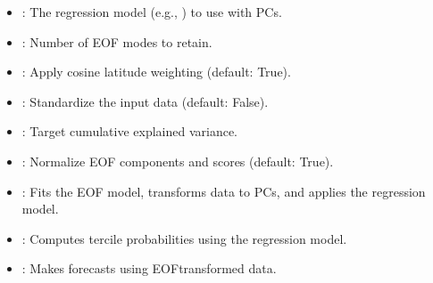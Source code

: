 \documentclass[letterpaper,10pt,english]{sphinxmanual}
\begin{document}
\sphinxAtStartPar
{}
\begin{itemize}
\item {} 
\sphinxAtStartPar
{}: The regression model (e.g., ) to use with PCs.

\item {} 
\sphinxAtStartPar
{}: Number of EOF modes to retain.

\item {} 
\sphinxAtStartPar
{}: Apply cosine latitude weighting (default: True).

\item {} 
\sphinxAtStartPar
{}: Standardize the input data (default: False).

\item {} 
\sphinxAtStartPar
{}: Target cumulative explained variance.

\item {} 
\sphinxAtStartPar
{}: Normalize EOF components and scores (default: True).

\end{itemize}

\sphinxAtStartPar
{}
\begin{itemize}
\item {} 
\sphinxAtStartPar
{}: Fits the EOF model, transforms data to PCs, and applies the regression model.

\item {} 
\sphinxAtStartPar
{}: Computes tercile probabilities using the regression model.

\item {} 
\sphinxAtStartPar
{}: Makes forecasts using EOF\sphinxhyphen{}transformed data.

\end{itemize}

\sphinxAtStartPar
{}
\end{document}
